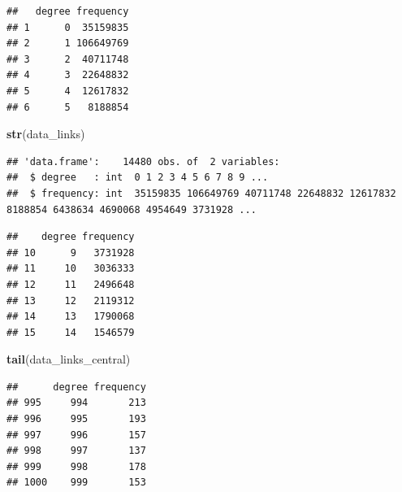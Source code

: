 \documentclass[
]{article}
\newenvironment{Shaded}{\begin{snugshade}}{\end{snugshade}}
\newcommand{\CommentTok}[1]{\textcolor[rgb]{0.56,0.35,0.01}{\textit{#1}}}
\newcommand{\DecValTok}[1]{\textcolor[rgb]{0.00,0.00,0.81}{#1}}
\newcommand{\KeywordTok}[1]{\textcolor[rgb]{0.13,0.29,0.53}{\textbf{#1}}}
\newcommand{\NormalTok}[1]{#1}
\newcommand{\OperatorTok}[1]{\textcolor[rgb]{0.81,0.36,0.00}{\textbf{#1}}}
\begin{document}
\begin{verbatim}
##   degree frequency
## 1      0  35159835
## 2      1 106649769
## 3      2  40711748
## 4      3  22648832
## 5      4  12617832
## 6      5   8188854
\end{verbatim}

\begin{Shaded}
\begin{Highlighting}[]
\KeywordTok{str}\NormalTok{(data\_links)}
\end{Highlighting}
\end{Shaded}

\begin{verbatim}
## 'data.frame':    14480 obs. of  2 variables:
##  $ degree   : int  0 1 2 3 4 5 6 7 8 9 ...
##  $ frequency: int  35159835 106649769 40711748 22648832 12617832 8188854 6438634 4690068 4954649 3731928 ...
\end{verbatim}

\begin{Shaded}
\end{Shaded}

\begin{verbatim}
##    degree frequency
## 10      9   3731928
## 11     10   3036333
## 12     11   2496648
## 13     12   2119312
## 14     13   1790068
## 15     14   1546579
\end{verbatim}

\begin{Shaded}
\begin{Highlighting}[]
\KeywordTok{tail}\NormalTok{(data\_links\_central)}
\end{Highlighting}
\end{Shaded}

\begin{verbatim}
##      degree frequency
## 995     994       213
## 996     995       193
## 997     996       157
## 998     997       137
## 999     998       178
## 1000    999       153
\end{verbatim}
\end{document}
